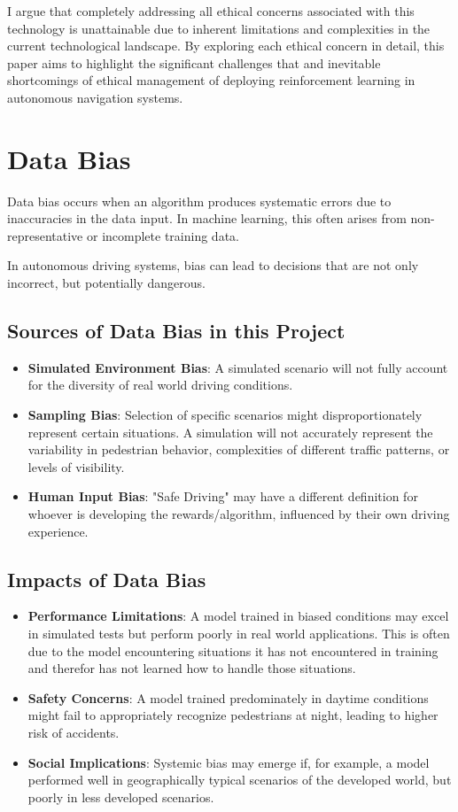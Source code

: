 \documentclass[10pt,twocolumn]{article}
\begin{document}
I argue that completely addressing all ethical concerns associated with this technology is unattainable due to inherent limitations and complexities in the current technological landscape. By exploring each ethical concern in detail, this paper aims to  highlight the significant challenges that and inevitable shortcomings of ethical management of deploying reinforcement learning in autonomous navigation systems.
\section{Data Bias}
    Data bias occurs when an algorithm produces systematic errors due to inaccuracies in the data input. In machine learning, this often arises from non-representative or incomplete training data.

    In autonomous driving systems, bias can lead to decisions that are not only incorrect, but potentially dangerous\cite{AlgorithmBiasInAutonomousSystems}.
\subsection{Sources of Data Bias in this Project}
    \begin{itemize}
        \item \textbf{Simulated Environment Bias}: A simulated scenario will not fully account for the diversity of real world driving conditions.
        \item \textbf{Sampling Bias}: Selection of specific scenarios might disproportionately represent certain situations. A simulation will not accurately represent the variability in pedestrian behavior, complexities of different traffic patterns, or levels of visibility.
        \item \textbf{Human Input Bias}: "Safe Driving" may have a different definition for whoever is developing the rewards/algorithm, influenced by their own driving experience.
    \end{itemize}
\subsection{Impacts of Data Bias}
    \begin{itemize}
        \item \textbf{Performance Limitations}: A model trained in biased conditions may excel in simulated tests but perform poorly in real world applications. This is often due to the model encountering situations it has not encountered in training and therefor has not learned how to handle those situations.
        \item \textbf{Safety Concerns}: A model trained predominately in daytime conditions might fail to appropriately recognize pedestrians at night, leading to higher risk of accidents.
        \item \textbf{Social Implications}: Systemic bias may emerge if, for example, a model performed well in geographically typical scenarios of the developed world, but poorly in less developed scenarios.
    \end{itemize}
\end{document}
